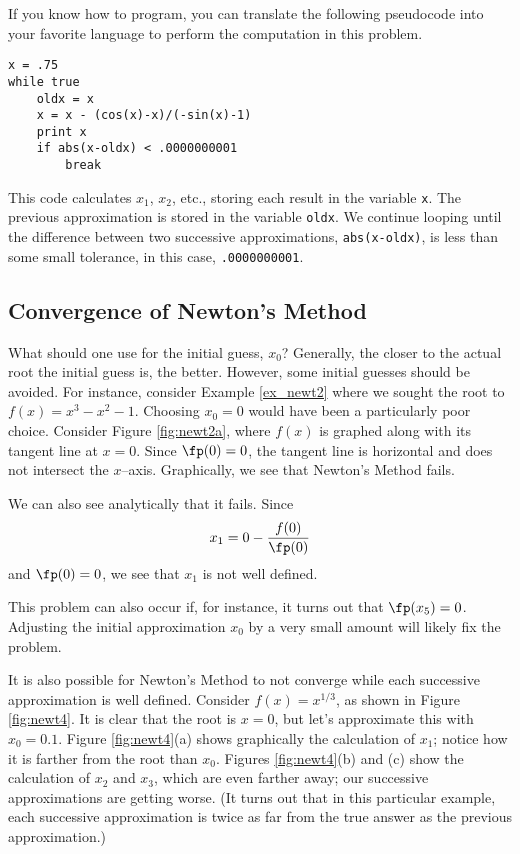If you know how to program, you can translate the following pseudocode into your favorite language to perform the computation in this problem.
\begin{center}
\begin{verbatim}
x = .75
while true
    oldx = x
    x = x - (cos(x)-x)/(-sin(x)-1)
    print x
    if abs(x-oldx) < .0000000001
        break
\end{verbatim}
\end{center}

This code calculates $x_1$, $x_2$, etc., storing each result in the variable \texttt{x}.  The previous approximation is stored in the variable \texttt{oldx}.  We continue looping until the difference between two successive approximations, \texttt{abs(x-oldx)}, is less than some small tolerance, in this case,
\texttt{.0000000001}.\\

\subsection*{Convergence of Newton's Method}

What should one use for the initial guess, $x_0$?  Generally, the closer to the actual root the initial guess is, the better.  However, some initial guesses should be avoided.  For instance, consider Example \ref{ex_newt2} where we sought the root to $f(x) = x^3-x^2-1$.  Choosing  $x_0=0$ would have been a particularly poor choice. Consider Figure \ref{fig:newt2a}, where $f(x)$ is graphed along with its tangent line at $x=0$. Since $\fp(0)=0$, the tangent line is horizontal and does not intersect the $x$--axis. Graphically, we see that Newton's Method fails.


We can also see analytically that it fails. Since $$x_1 = 0 -\frac{f(0)}{\fp(0)}$$ and $\fp(0)=0$, we see that $x_1$ is not well defined.  

This problem can also occur if, for instance, it turns out that $\fp(x_5)=0$. Adjusting the initial approximation $x_0$ by a very small amount will likely fix the problem.

It is also possible for Newton's Method to not converge while each successive approximation is well defined. Consider $f(x) = x^{1/3}$, as shown in Figure \ref{fig:newt4}. It is clear that the root is $x=0$, but let's approximate this with $x_0=0.1$. Figure \ref{fig:newt4}(a) shows graphically the calculation of $x_1$; notice how it is farther from the root than $x_0$. Figures \ref{fig:newt4}(b) and (c) show the calculation of $x_2$ and $x_3$, which are even farther away; our successive approximations are getting worse. (It turns out that in this particular example, each successive approximation is twice as far from the true answer as the previous approximation.)


